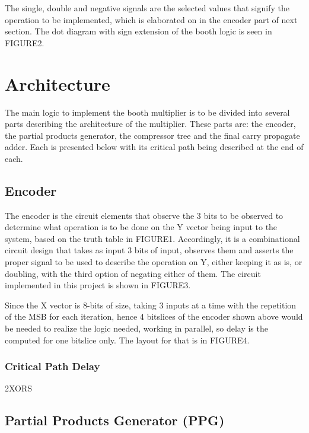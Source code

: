 \documentclass[conference]{IEEEtran}
\begin{document}
The single, double and negative signals are the selected values that signify the operation to be implemented, which is elaborated on in the encoder part of next section. The dot diagram with sign extension of the booth logic is seen in FIGURE2.





\section{Architecture}

The main logic to implement the booth multiplier is to be divided into several parts describing the architecture of the multiplier. These parts are: the encoder, the partial products generator, the compressor tree and the final carry propagate adder. Each is presented below with its critical path being described at the end of each.


\subsection{Encoder}

The encoder is the circuit elements that observe the 3 bits to be observed to determine what operation is to be done on the Y vector being input to the system, based on the truth table in FIGURE1. Accordingly, it is a combinational circuit design that takes as input 3 bits of input, observes them and asserts the proper signal to be used to describe the operation on Y, either keeping it as is, or doubling, with the third option of negating either of them. The circuit implemented in this project is shown in FIGURE3.


Since the X vector is 8-bits of size, taking 3 inputs at a time with the repetition of the MSB for each iteration, hence 4 bitslices of the encoder shown above would be needed to realize the logic needed, working in parallel, so delay is the computed for one bitslice only. The layout for that is in FIGURE4.

\subsubsection{Critical Path Delay}

2XORS


\subsection{Partial Products Generator (PPG)}
\end{document}
